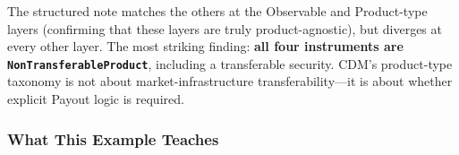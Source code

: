 \documentclass[11pt,a4paper]{article}
\begin{document}
\noindent The structured note matches the others at the Observable and Product-type layers (confirming that these layers are truly product-agnostic), but diverges at every other layer. The most striking finding: \textbf{all four instruments are \texttt{NonTransferableProduct}}, including a transferable security. CDM's product-type taxonomy is not about market-infrastructure transferability---it is about whether explicit Payout logic is required.

\subsubsection{What This Example Teaches}
\label{sec:cdm-sn-lessons}
\end{document}
